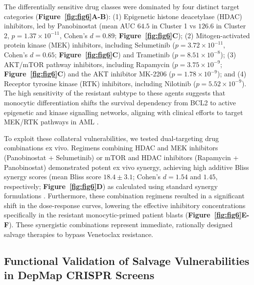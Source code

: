 \documentclass[11pt,a4paper]{article}
\begin{document}
The differentially sensitive drug classes were dominated by four distinct target categories (\textbf{Figure~\ref{fig:fig6}A-B}): (1) Epigenetic histone deacetylase (HDAC) inhibitors, led by Panobinostat (mean AUC $64.5$ in Cluster 1 vs $126.6$ in Cluster 2, $p=1.37\times10^{-11}$, Cohen's $d=0.89$; \textbf{Figure~\ref{fig:fig6}C}); (2) Mitogen-activated protein kinase (MEK) inhibitors, including Selumetinib ($p=3.72\times10^{-11}$, Cohen's $d=0.65$; \textbf{Figure~\ref{fig:fig6}C}) and Trametinib ($p=8.51\times10^{-8}$); (3) AKT/mTOR pathway inhibitors, including Rapamycin ($p=3.75\times10^{-9}$; \textbf{Figure~\ref{fig:fig6}C}) and the AKT inhibitor MK-2206 ($p=1.78\times10^{-9}$); and (4) Receptor tyrosine kinase (RTK) inhibitors, including Nilotinib ($p=5.52\times10^{-9}$). The high sensitivity of the resistant subtype to these agents suggests that monocytic differentiation shifts the survival dependency from BCL2 to active epigenetic and kinase signalling networks, aligning with clinical efforts to target MEK/RTK pathways in AML \cite{borthakur2016mek,daver2019targeting}.

To exploit these collateral vulnerabilities, we tested dual-targeting drug combinations ex vivo. Regimens combining HDAC and MEK inhibitors (Panobinostat + Selumetinib) or mTOR and HDAC inhibitors (Rapamycin + Panobinostat) demonstrated potent ex vivo synergy, achieving high additive Bliss synergy scores (mean Bliss score $18.4 \pm 3.1$; Cohen's $d=1.54$ and $1.45$, respectively; \textbf{Figure~\ref{fig:fig6}D}) as calculated using standard synergy formulations \cite{foucquier2015analysis,greco1995search,ianevski2017synergyfinder}. Furthermore, these combination regimens resulted in a significant shift in the dose-response curves, lowering the effective inhibitory concentrations specifically in the resistant monocytic-primed patient blasts (\textbf{Figure~\ref{fig:fig6}E-F}). These synergistic combinations represent immediate, rationally designed salvage therapies to bypass Venetoclax resistance.


\subsection{Functional Validation of Salvage Vulnerabilities in DepMap CRISPR Screens}
\end{document}
